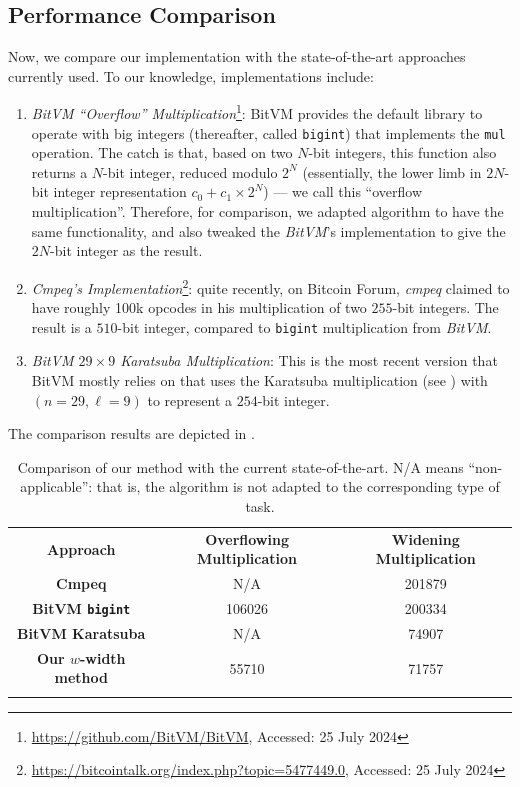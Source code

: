 \documentclass{iacrtrans}
\begin{document}
\subsection{Performance Comparison}

Now, we compare our implementation with the state-of-the-art approaches currently used. To our knowledge, implementations include:
\begin{enumerate}
    \item \textit{BitVM ``Overflow'' Multiplication}\footnote{\url{https://github.com/BitVM/BitVM}, Accessed: 25 July 2024}: BitVM provides the default library to operate with big integers (thereafter, called \texttt{bigint}) that implements the \texttt{mul} operation. The catch is that, based on two $N$-bit integers, this function also returns a $N$-bit integer, reduced modulo $2^N$ (essentially, the lower limb in $2N$-bit integer representation $c_0 + c_1 \times 2^N$) --- we call this ``overflow multiplication''. Therefore, for comparison, we adapted algorithm  to have the same functionality, and also tweaked the \textit{BitVM}'s implementation to give the $2N$-bit integer as the result.
    \item \textit{Cmpeq's Implementation}\footnote{
    \url{https://bitcointalk.org/index.php?topic=5477449.0}, Accessed: 25 July 2024}: quite recently, on Bitcoin Forum, \textit{cmpeq} claimed to have roughly \textsf{100k} opcodes in his multiplication of two $255$-bit integers. The result is a $510$-bit integer, compared to \texttt{bigint} multiplication from \textit{BitVM}. 
    \item \textit{BitVM $29\times 9$ Karatsuba Multiplication}: This is the most recent version that BitVM mostly relies on that uses the Karatsuba multiplication (see ) with $(n=29,\ell=9)$ to represent a $254$-bit integer.
\end{enumerate}

The comparison results are depicted in .

\begin{table}
\centering
\begin{tabular}{ccc} 
\hline
\textbf{Approach} & \textbf{Overflowing Multiplication} & \textbf{Widening Multiplication} \\ \Xhline{3\arrayrulewidth}
  \textbf{Cmpeq} & N/A & \num[group-separator={,}]{201879} \\ \hline
  \textbf{BitVM \texttt{bigint}} & \num[group-separator={,}]{106026} & \num[group-separator={,}]{200334} \\ \hline
 \textbf{BitVM Karatsuba} & N/A & 	
    \num[group-separator={,}]{74907} \\ \hdashline
  \textbf{Our $w$-width method} & \num[group-separator={,}]{55710} & \num[group-separator={,}]{71757} \\ 
\Xhline{3\arrayrulewidth}
\end{tabular}
\caption{Comparison of our method with the current state-of-the-art. N/A means ``non-applicable'': that is, the algorithm is not adapted to the corresponding type of task.}
\label{tab:comparison}
\end{table}
\end{document}
